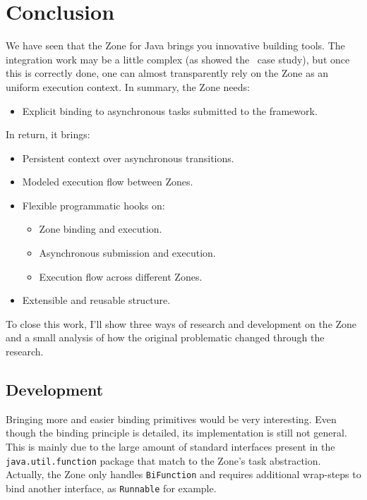 
\chapter{Conclusion}
\label{ch:conclusion}

We have seen that the Zone for Java brings you innovative building tools. The integration work may be a little complex (as showed the \vertx\ case study), but once this is correctly done, one can almost transparently rely on the Zone as an uniform execution context. In summary, the Zone needs:
\begin{itemize}
\item Explicit binding to asynchronous tasks submitted to the framework.
\end{itemize}

In return, it brings:
\begin{itemize}
\item Persistent context over asynchronous transitions.
\item Modeled execution flow between Zones.
\item Flexible programmatic hooks on:
  \begin{itemize}
  \item Zone binding and execution.
  \item Asynchronous submission and execution.
  \item Execution flow across different Zones.
  \end{itemize}
\item Extensible and reusable structure.
\end{itemize}

To close this work, I'll show three ways of research and development on the Zone and a small analysis of how the original problematic changed through the research.

\section{Development}

Bringing more and easier binding primitives would be very interesting. Even though the binding principle is detailed, its implementation is still not general. This is mainly due to the large amount of standard interfaces present in the \lstinline{java.util.function} package that match to the Zone's task abstraction. Actually, the Zone only handles \lstinline{BiFunction} and requires additional wrap-steps to bind another interface, as \lstinline{Runnable} for example.

